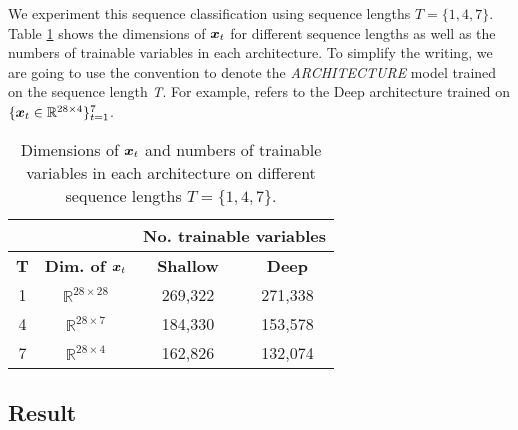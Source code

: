 We experiment this sequence classification using sequence lengths $T = \{1, 4, 7\}$.  Table \ref{tab:seq-length} shows the dimensions of $\patvector{x}_t$ for different sequence lengths as well as the numbers of trainable variables in each architecture. To simplify the writing, we are going to use the convention \textit{} to denote the \textit{ARCHITECTURE} model trained on the sequence length \textit{T}. For example,  refers to the Deep architecture trained on $\{ \boldsymbol{x}_t \in \mathbb{R}^{28 \times 4} \}_{t=1}^{7}$.


\renewcommand{\arraystretch}{1.5}
\begin{table}[h]
\centering
\caption{Dimensions of $\patvector{x}_t$ and numbers of trainable variables in each architecture on different sequence lengths $T=\{1, 4, 7\}$.}
\begin{tabular}{cc|c|c|}
\cline{3-4}
& & \multicolumn{2}{c|}{\textbf{No. trainable variables}}                                                                \\ \hline
\multicolumn{1}{|c|}{\textbf{T}}               & \multicolumn{1}{c|}{\textbf{Dim. of $\boldsymbol{x}_t$}} & \multicolumn{1}{c|}{\textbf{Shallow}} & \multicolumn{1}{c|}{\textbf{Deep}}  \\ \hline
\multicolumn{1}{|c|}{1} & $\mathbb{R}^{28 \times 28}$ & 269,322  &  271,338 \\
\multicolumn{1}{|c|}{4} & $\mathbb{R}^{28  \times  7}$ & 184,330 & 153,578 \\
\multicolumn{1}{|c|}{7} & $\mathbb{R}^{28  \times  4}$ & 162,826 & 132,074 \\ \hline

\end{tabular}

\label{tab:seq-length}
\end{table}
\renewcommand{\arraystretch}{1}





\subsection{Result}
\label{sec:exp1_result}

